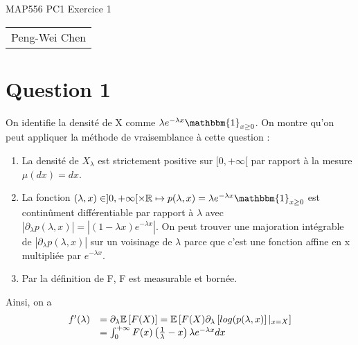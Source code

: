 \documentclass[12pt]{article}
\newcommand{\1}{\mathbb{I}} %
\begin{document}
\begin{center}
{\Large MAP556 PC1 Exercice 1}

\begin{tabular}{c}
Peng-Wei Chen
\end{tabular}
\end{center}
\section*{Question 1}
On identifie la densité de X comme $\lambda e^{-\lambda x} \mathbbm{1}_{x\ge 0}$. On montre qu'on peut appliquer la méthode de vraisemblance à cette question :
\begin{enumerate}
    \item La densité de $X_\lambda$ est strictement positive sur $[0, +\infty[$ par rapport à la mesure $\mu (dx) = dx$.
            \item La fonction $(\lambda, x)\in ]0, +\infty[ \times \mathbb{R} \mapsto p(\lambda, x) = \lambda e^{-\lambda x} \mathbbm{1}_{x\ge 0}$ est continûment différentiable par rapport à $\lambda$ avec $|\partial_{\lambda} p(\lambda, x)| = |(1 - \lambda x)e^{-\lambda x}|$. On peut trouver une majoration intégrable de $|\partial_{\lambda} p(\lambda, x)|$ sur un voisinage de $\lambda$ parce que c'est une fonction affine en x multipliée par $e^{-\lambda x}$.
    \item Par la définition de F, F est measurable et bornée.
\end{enumerate}
Ainsi, on a
\begin{equation*}
    \begin{array}[h]{r l}
f'(\lambda) & = \partial_\lambda \mathbb{E}\left[F(X)\right] = \mathbb{E}\left[ F(X)\partial_\lambda\left[log(p(\lambda, x)\right]|_{x = X}\right]\\
    &   = \int_0^{+\infty} F(x)\left( \frac{1}{\lambda} - x\right) \lambda e^{-\lambda x} dx\\
        
    \end{array}
\end{equation*}
\end{document}
